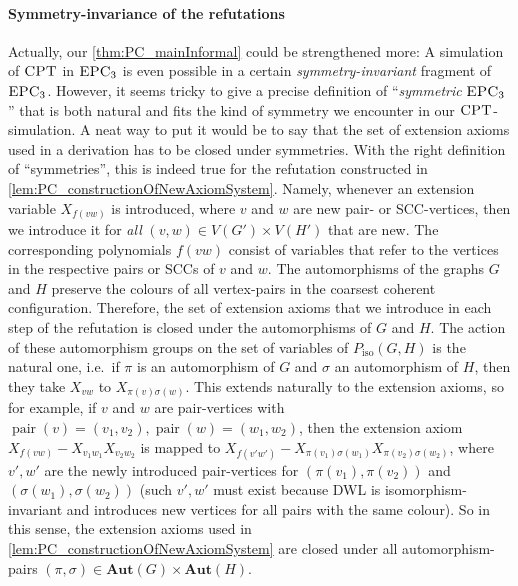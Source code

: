 \documentclass[a4paper,UKenglish,cleveref, autoref, thm-restate]{lipics-v2021}
\newcommand{\CPT}{\mbox{\sc CPT}}
\newcommand{\Aut}{\mathbf{Aut}}
\newcommand{\EPC}{\mbox{\sc EPC}}
\newcommand{\pair}{{\operatorname{pair}}}
\newcommand{\Piso}{P_{\text{iso}}}
\begin{document}
	\paragraph*{Symmetry-invariance of the refutations}
	Actually, our \autoref{thm:PC_mainInformal} could be strengthened more: A simulation of $\CPT$ in $\EPC_3$ is even possible in a certain \emph{symmetry-invariant} fragment of $\EPC_3$. However, it seems tricky to give a precise definition of ``\emph{symmetric} $\EPC_3$'' that is both natural and fits the kind of symmetry we encounter in our $\CPT$-simulation. 
	A neat way to put it would be to say that the set of extension axioms used in a derivation has to be closed under symmetries. With the right definition of ``symmetries'', this is indeed true for the refutation constructed in \autoref{lem:PC_constructionOfNewAxiomSystem}. Namely, whenever an extension variable $X_{f(vw)}$ is introduced, where $v$ and $w$ are new pair- or SCC-vertices, then we introduce it for \emph{all} $(v,w) \in V(G') \times V(H')$ that are new. The corresponding polynomials $f(vw)$ consist of variables that refer to the vertices in the respective pairs or SCCs of $v$ and $w$. The automorphisms of the graphs $G$ and $H$ preserve the colours of all vertex-pairs in the coarsest coherent configuration. Therefore, the set of extension axioms that we introduce in each step of the refutation is closed under the automorphisms of $G$ and $H$. The action of these automorphism groups on the set of variables of $\Piso(G,H)$ is the natural one, i.e.\ if $\pi$ is an automorphism of $G$ and $\sigma$ an automorphism of $H$, then they take $X_{vw}$ to $X_{\pi(v)\sigma(w)}$. This extends naturally to the extension axioms, so for example, if $v$ and $w$ are pair-vertices with $\pair(v) = (v_1,v_2), \pair(w) = (w_1,w_2)$, then the extension axiom $X_{f(vw)} - X_{v_1w_1}X_{v_2w_2}$ is mapped to $X_{f(v'w')} - X_{\pi(v_1)\sigma(w_1)}X_{\pi(v_2)\sigma(w_2)}$, where $v',w'$ are the newly introduced pair-vertices for $(\pi(v_1),\pi(v_2))$ and $(\sigma(w_1),\sigma(w_2))$ (such $v',w'$ must exist because DWL is isomorphism-invariant and introduces new vertices for all pairs with the same colour). So in this sense, the extension axioms used in \autoref{lem:PC_constructionOfNewAxiomSystem} are closed under all automorphism-pairs $(\pi, \sigma) \in \Aut(G) \times \Aut(H)$.\\
\end{document}

